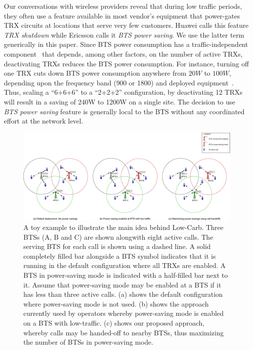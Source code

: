 Our conversations with
wireless providers reveal that during low traffic periods, they often use a feature available in most vendor's equipment that power-gates TRX circuits at locations that
serve very few customers. Huawei calls this feature \textit{TRX shutdown} while Ericsson calls it \textit{BTS power saving}. We use the latter term generically in this paper. Since BTS power consumption has a traffic-independent
component~\cite{Peng:2011:BTSSaving:Mobicom} that depends,
among other factors, on the number of active TRXs, deactivating
TRXs reduces the BTS power consumption. For instance, turning
off one TRX cuts down BTS power consumption anywhere from $20W$
to $100W$, depending upon the frequency band (900 or 1800) and
deployed
equipment~\cite{Lorincz:BTS-Measure:Sensors:2012,flexibsc}.
Thus, scaling a ``6+6+6'' to a ``2+2+2'' configuration, by deactivating 12
TRXs will result in a saving of
240W to 1200W on a single site. The decision to use \textit{BTS
power saving} feature is generally local to the BTS without any
coordinated effort at the network level.

\begin{figure}
\includegraphics[width=1\textwidth]{figures/illustrationall.eps}
\caption{A toy example to illustrate the main idea behind Low-Carb. Three BTSs (A, B and C) are shown alongwith eight active calls. The serving BTS for each call is shown using a dashed line. A solid completely filled bar alongside a BTS symbol indicates that it is running in the default configuration where all TRXs are enabled. A BTS in power-saving mode is indicated with a half-filled bar next to it. Assume that power-saving mode may be enabled at a BTS if it has less than three active calls. (a) shows the default configuration where power-saving mode is not used. (b) shows the approach currently used by operators whereby power-saving mode is enabled on a BTS with low-traffic. (c) shows our proposed approach, whereby calls may be handed-off to nearby BTSs, thus maximizing the number of BTSs in power-saving mode.}
\label{fig:illustrationall}
\end{figure}


